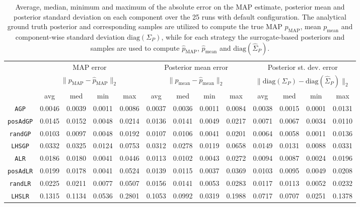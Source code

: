 \begin{table}[H]

    \centering
    \hspace*{-1.5cm}
    \begin{tabular}{ccccccccccccc}
    \toprule
        & \multicolumn{4}{c}{MAP error}  & \multicolumn{4}{c}{Posterior mean error} & \multicolumn{4}{c}{Posterior st. dev. error} \\ 
        & \multicolumn{4}{c}{$ \|p_\text{MAP} - \hat p _\text{MAP}\|_2 $}  & \multicolumn{4}{c}{$ \|p_\text{mean} - \hat p _\text{mean}\|_2 $} & \multicolumn{4}{c}{$\| \text{diag}(\Sigma_P) - \text{diag}( \hat \Sigma _P) \|_2$} \\ 
        & avg   & med   & min   & max   & avg   & med   & min   & max   & avg   & med   & min   & max \\
        \midrule
        \texttt{AGP}
        & 0.0046 & 0.0039 & 0.0011 & 0.0086
        & 0.0037 & 0.0036 & 0.0011 & 0.0084
        & 0.0038 & 0.0015 & 0.0001 & 0.0131 \\
        \texttt{posAdGP}
        & 0.0145 & 0.0152 & 0.0048 & 0.0214 
        & 0.0136 & 0.0141 & 0.0049 & 0.0217
        & 0.0071 & 0.0067 & 0.0034 & 0.0110 \\
        \texttt{randGP}
        & 0.0103 & 0.0097 & 0.0048 & 0.0192 
        & 0.0107 & 0.0106 & 0.0041 & 0.0201
        & 0.0064 & 0.0058 & 0.0011 & 0.0136 \\
        \texttt{LHSGP}
        & 0.0332 & 0.0325 & 0.0124 & 0.0753 
        & 0.0312 & 0.0278 & 0.0119 & 0.0658
        & 0.0149 & 0.0131 & 0.0088 & 0.0331 \\
        \texttt{ALR}
        & 0.0186 & 0.0180 & 0.0041 & 0.0446
        & 0.0113 & 0.0102 & 0.0043 & 0.0272
        & 0.0094 & 0.0087 & 0.0024 & 0.0196 \\
        \texttt{posAdLR}
        & 0.0199 & 0.0178 & 0.0041 & 0.0524
        & 0.0139 & 0.0115 & 0.0037 & 0.0369
        & 0.0103 & 0.0095 & 0.0049 & 0.0208 \\
        \texttt{randLR}
        & 0.0225 & 0.0211 & 0.0077 & 0.0507
        & 0.0156 & 0.0141 & 0.0053 & 0.0283
        & 0.0117 & 0.0113 & 0.0052 & 0.0232 \\
        \texttt{LHSLR}
        & 0.1315 & 0.1134 & 0.0536 & 0.2801 
        & 0.1053 & 0.0992 & 0.0319 & 0.1988
        & 0.0717 & 0.0707 & 0.0251 & 0.1378 \\
        
    \bottomrule
    \end{tabular}
    \caption{Average, median, minimum and maximum of the absolute error on the MAP estimate, posterior mean and posterior standard deviation on each component over the 25 runs with default configuration.
    The analytical ground truth posterior and corresponding samples are utilized to compute the true MAP $p_\text{MAP}$, mean $p_\text{mean}$ and component-wise standard deviation $\text{diag}(\Sigma_P)$, while for each strategy the surrogate-based posteriors and samples are used to compute $\hat p_\text{MAP}$, $\hat p_\text{mean}$ and $\text{diag}(\hat \Sigma_P)$.
    }
    \label{tab:3d-comparison}
    
    
\end{table}

